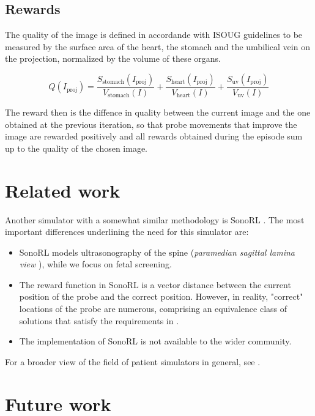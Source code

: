 \subsection{Rewards}

The quality of the image is defined in accordande with ISOUG guidelines \cite{isoug-guidelines} to be measured by the surface area of the heart, the stomach and the umbilical vein on the projection, normalized by the volume of these organs.

\begin{equation}
    Q(I_\text{proj}) = \frac{S_\text{stomach}(I_\text{proj})}{V_\text{stomach}(I)} + \frac{S_\text{heart}(I_\text{proj})}{V_\text{heart}(I)} + \frac{S_\text{uv}(I_\text{proj})}{V_\text{uv}(I)}
\end{equation}

The reward then is the diffence in quality between the current image and the one obtained at the previous iteration, so that probe movements that improve the image are rewarded positively and all rewards obtained during the episode sum up to the quality of the chosen image.

\section{Related work}

Another simulator with a somewhat similar methodology is SonoRL \cite{sonorl}. The most important differences underlining the need for this simulator are:
\begin{itemize}
    \item SonoRL models ultrasonography of the spine (\emph{paramedian sagittal lamina view} \cite{spinal-guidelines}), while we focus on fetal screening.
    \item The reward function in SonoRL is a vector distance between the current position of the probe and the correct position. However, in reality, "correct" locations of the probe are numerous, comprising an equivalence class of solutions that satisfy the requirements in \cite{isoug-guidelines}.
    \item The implementation of SonoRL is not available to the wider community.
\end{itemize}

For a broader view of the field of patient simulators in general, see \cite{towards}.

\section{Future work}

